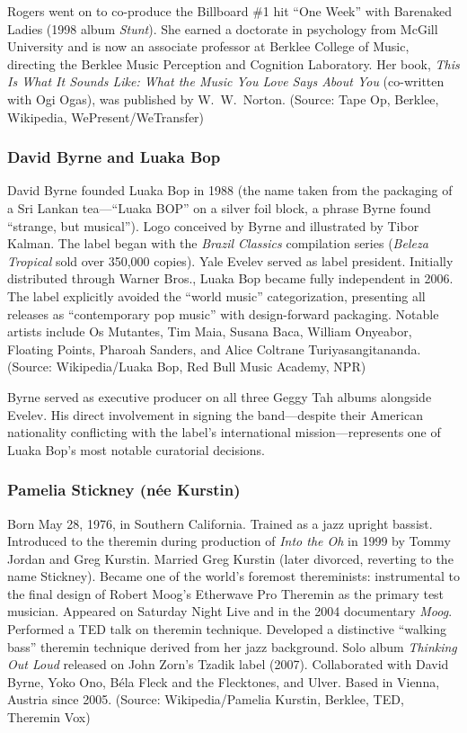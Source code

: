 \documentclass[11pt,letterpaper]{article}
\begin{document}
Rogers went on to co-produce the Billboard \#1 hit ``One Week'' with Barenaked Ladies (1998 album \textit{Stunt}). She earned a doctorate in psychology from McGill University and is now an associate professor at Berklee College of Music, directing the Berklee Music Perception and Cognition Laboratory. Her book, \textit{This Is What It Sounds Like: What the Music You Love Says About You} (co-written with Ogi Ogas), was published by W.\ W.\ Norton. (Source: Tape Op, Berklee, Wikipedia, WePresent/WeTransfer)

\subsubsection{David Byrne and Luaka Bop}

David Byrne founded Luaka Bop in 1988 (the name taken from the packaging of a Sri Lankan tea---``Luaka BOP'' on a silver foil block, a phrase Byrne found ``strange, but musical''). Logo conceived by Byrne and illustrated by Tibor Kalman. The label began with the \textit{Brazil Classics} compilation series (\textit{Beleza Tropical} sold over 350,000 copies). Yale Evelev served as label president. Initially distributed through Warner Bros., Luaka Bop became fully independent in 2006. The label explicitly avoided the ``world music'' categorization, presenting all releases as ``contemporary pop music'' with design-forward packaging. Notable artists include Os Mutantes, Tim Maia, Susana Baca, William Onyeabor, Floating Points, Pharoah Sanders, and Alice Coltrane Turiyasangitananda. (Source: Wikipedia/Luaka Bop, Red Bull Music Academy, NPR)

Byrne served as executive producer on all three Geggy Tah albums alongside Evelev. His direct involvement in signing the band---despite their American nationality conflicting with the label's international mission---represents one of Luaka Bop's most notable curatorial decisions.

\subsubsection{Pamelia Stickney (née Kurstin)}

Born May 28, 1976, in Southern California. Trained as a jazz upright bassist. Introduced to the theremin during production of \textit{Into the Oh} in 1999 by Tommy Jordan and Greg Kurstin. Married Greg Kurstin (later divorced, reverting to the name Stickney). Became one of the world's foremost thereminists: instrumental to the final design of Robert Moog's Etherwave Pro Theremin as the primary test musician. Appeared on Saturday Night Live and in the 2004 documentary \textit{Moog}. Performed a TED talk on theremin technique. Developed a distinctive ``walking bass'' theremin technique derived from her jazz background. Solo album \textit{Thinking Out Loud} released on John Zorn's Tzadik label (2007). Collaborated with David Byrne, Yoko Ono, Béla Fleck and the Flecktones, and Ulver. Based in Vienna, Austria since 2005. (Source: Wikipedia/Pamelia Kurstin, Berklee, TED, Theremin Vox)
\end{document}
